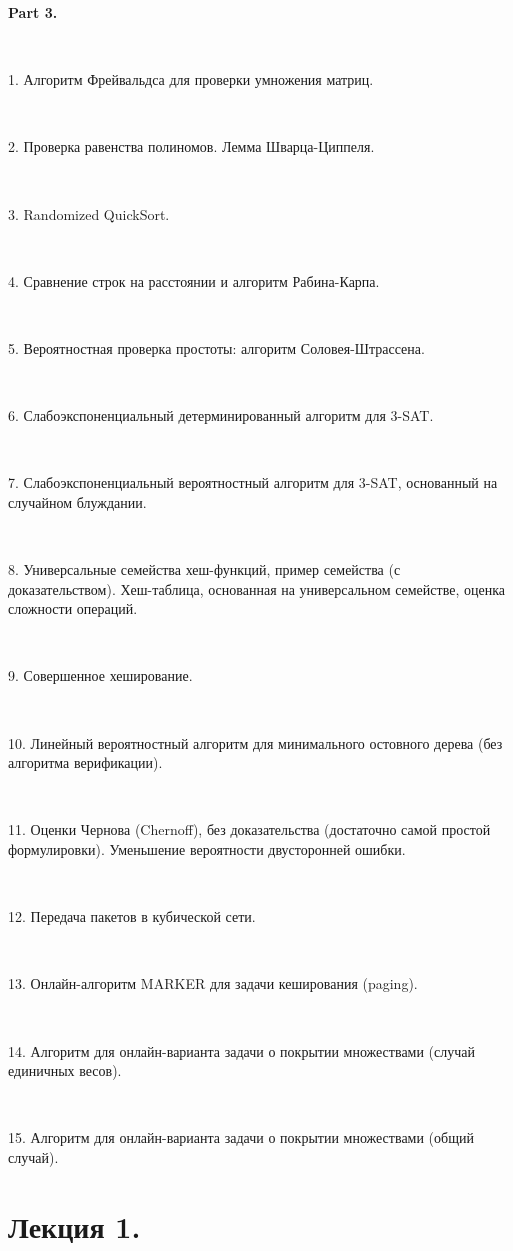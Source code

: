\documentclass[a4paper]{article}
\theoremstyle{indented}
\theoremstyle{definition}
\theoremstyle{remark}
\begin{document}
\textbf{Part 3.}  
 
\ 

1. Алгоритм Фрейвальдса для проверки умножения матриц.

\ 

2. Проверка равенства полиномов. Лемма Шварца-Циппеля.

\ 

3. Randomized QuickSort.

\ 

4. Сравнение строк на расстоянии и алгоритм Рабина-Карпа.

\ 

5. Вероятностная проверка простоты: алгоритм Соловея-Штрассена.

\ 

6. Слабоэкспоненциальный детерминированный алгоритм для 3-SAT.

\ 

7. Слабоэкспоненциальный вероятностный алгоритм для 3-SAT, основанный на случайном блуждании.

\ 

8. Универсальные семейства хеш-функций, пример семейства (с доказательством). Хеш-таблица, основанная на универсальном семействе, оценка сложности операций.

\ 

9. Совершенное хеширование. 

\ 

10. Линейный вероятностный алгоритм для минимального остовного дерева (без алгоритма верификации).

\ 

11. Оценки Чернова (Chernoff), без доказательства (достаточно самой простой формулировки). Уменьшение вероятности двусторонней ошибки.

\ 

12. Передача пакетов в кубической сети.

\ 

13. Онлайн-алгоритм MARKER для задачи кеширования (paging).

\ 

14. Алгоритм для онлайн-варианта задачи о покрытии множествами (случай единичных весов).

\ 

15. Алгоритм для онлайн-варианта задачи о покрытии множествами (общий случай).


\newpage

\section{Лекция 1.} 
\end{document}
